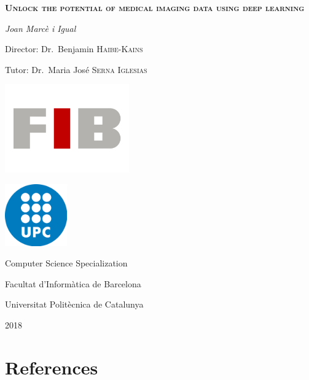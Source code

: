 \documentclass[a4paper, 12pt]{article}
\begin{document}
\begin{titlepage}
  \centering
  \vspace{1.5cm}
  {\huge \textbf{\textsc{Unlock the potential of medical imaging data using deep learning}} \par}
  \vspace{2cm}
  {\Large \textit{Joan Marcè i Igual}\par}
  \vfill
  {Director: Dr.~Benjamin \textsc{Haibe-Kains} \par}
  {Tutor: Dr.~Maria José \textsc{Serna Iglesias} \par}
  
  \vfill

  \includegraphics[width=0.4\textwidth]{images/logo_FIB}\par
  
  \vspace{.5cm}
  
  \includegraphics[width=0.2\textwidth]{images/logo_upc}\par
  
  \vfill
  
  {\Large Computer Science Specialization \par}
  {\LARGE Facultat d'Informàtica de Barcelona \par}
  {\LARGE Universitat Politècnica de Catalunya \par}
  {\LARGE 2018 \par}
\end{titlepage}

\tableofcontents
\listoffigures
\listoftables

\pagebreak







\pagebreak
\section{References}
\printbibliography[heading=none]{}
\end{document}
